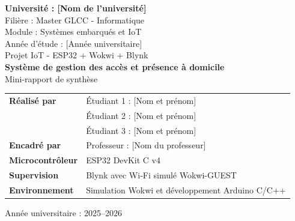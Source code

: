 \documentclass[12pt,a4paper]{report}
\begin{document}
\begin{titlepage}
  \centering
  \vspace*{0.4cm}


  \vspace{0.8cm}
  {\Large \textbf{Université : [Nom de l'université]}}\\[0.2cm]
  {\large Filière : Master GLCC - Informatique}\\
  {\large Module : Systèmes embarqués et IoT}\\
  {\large Année d'étude : [Année universitaire]}\\[1.1cm]

  {\large Projet IoT - ESP32 + Wokwi + Blynk}\\[0.4cm]
  {\Huge \textbf{Système de gestion des accès et présence à domicile}}\\[0.35cm]
  {\Large Mini-rapport de synthèse}\\[1.2cm]

  \begin{tabular}{>{\bfseries}p{5.2cm}p{8.2cm}}
    Réalisé par & Étudiant 1 : [Nom et prénom] \\
                 & Étudiant 2 : [Nom et prénom] \\
                 & Étudiant 3 : [Nom et prénom] \\[0.2cm]
    Encadré par & Professeur : [Nom du professeur] \\[0.2cm]
    Microcontrôleur & ESP32 DevKit C v4 \\
    Supervision & Blynk avec Wi-Fi simulé Wokwi-GUEST \\
    Environnement & Simulation Wokwi et développement Arduino C/C++ \\
  \end{tabular}

  \vfill
  {\large Année universitaire : 2025--2026}
\end{titlepage}

\tableofcontents
\clearpage
\listoffigures
\clearpage
\end{document}
